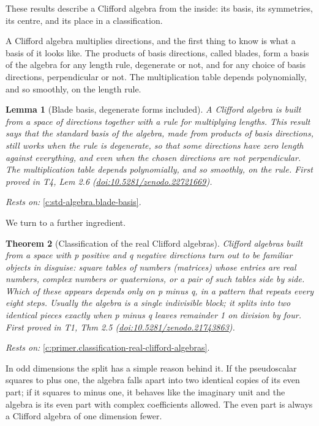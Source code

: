 \documentclass[11pt]{article}
\newtheorem{theorem}{Theorem}[section]
\newtheorem{lemma}[theorem]{Lemma}
\theoremstyle{definition}
\theoremstyle{plain}
\begin{document}
These results describe a Clifford algebra from the inside: its basis, its symmetries, its centre, and its place in a classification.

A Clifford algebra multiplies directions, and the first thing to know is what a basis of it looks like. The products of basis directions, called blades, form a basis of the algebra for any length rule, degenerate or not, and for any choice of basis directions, perpendicular or not. The multiplication table depends polynomially, and so smoothly, on the length rule.

\begin{lemma}[Blade basis, degenerate forms included]\label{c:sheaf.blade-basis-degenerate-forms-included}
A Clifford algebra is built from a space of directions together with a rule for multiplying lengths. This result says that the standard basis of the algebra, made from products of basis directions, still works when the rule is degenerate, so that some directions have zero length against everything, and even when the chosen directions are not perpendicular. The multiplication table depends polynomially, and so smoothly, on the rule.
\emph{First proved in} T4, Lem 2.6 (\href{https://doi.org/10.5281/zenodo.22721669}{doi:10.5281/zenodo.22721669}).
\end{lemma}
\noindent\emph{Rests on:} \ref{c:std-algebra.blade-basis}.

We turn to a further ingredient.

\begin{theorem}[Classification of the real Clifford algebras]\label{c:transport.classification-real-clifford-algebras}
Clifford algebras built from a space with p positive and q negative directions turn out to be familiar objects in disguise: square tables of numbers (matrices) whose entries are real numbers, complex numbers or quaternions, or a pair of such tables side by side. Which of these appears depends only on p minus q, in a pattern that repeats every eight steps. Usually the algebra is a single indivisible block; it splits into two identical pieces exactly when p minus q leaves remainder 1 on division by four.
\emph{First proved in} T1, Thm 2.5 (\href{https://doi.org/10.5281/zenodo.21743863}{doi:10.5281/zenodo.21743863}).
\end{theorem}
\noindent\emph{Rests on:} \ref{c:primer.classification-real-clifford-algebras}.

In odd dimensions the split has a simple reason behind it. If the pseudoscalar squares to plus one, the algebra falls apart into two identical copies of its even part; if it squares to minus one, it behaves like the imaginary unit and the algebra is its even part with complex coefficients allowed. The even part is always a Clifford algebra of one dimension fewer.
\end{document}

